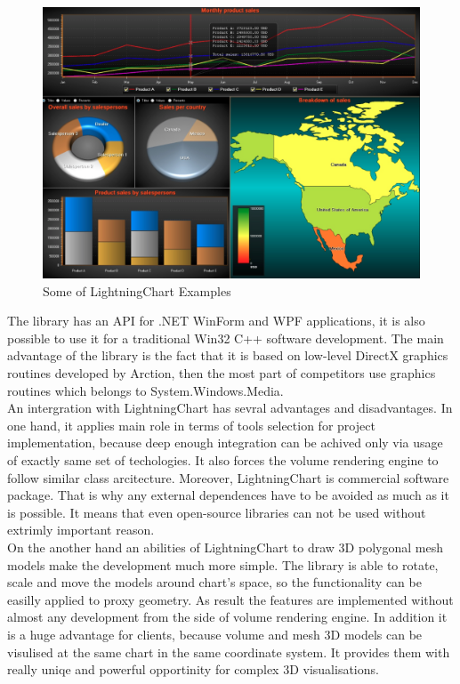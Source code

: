 \documentclass[twoside, english, 11pt]{report}
\begin{document}
\begin{figure}[!h]
\centerline{\includegraphics[scale=0.4]{img/chart}}
\caption{Some of LightningChart Examples}
\end{figure}

The library has an API for .NET WinForm and WPF applications, it is also possible to use it for a traditional Win32 C++ software development. The main advantage of the library is the fact that it is based on low-level DirectX graphics routines developed by Arction, then the most part of competitors use graphics routines which belongs to System.Windows.Media.\\

An intergration with LightningChart has sevral advantages and disadvantages. In one hand, it applies main role in terms of tools selection for project implementation, because deep enough integration can be achived only via usage of exactly same set of techologies. It also  forces the volume rendering engine to follow similar class arcitecture. Moreover, LightningChart is commercial software package. That is why any external dependences have to be avoided as much as it is possible. It means that even open-source libraries can not be used without extrimly important reason.\\

On the another hand an abilities of LightningChart to draw 3D polygonal mesh models make the development much more simple. The library is able to rotate, scale and move the models around chart's space, so the functionality can be easilly applied to proxy geometry. As result the features are implemented without almost any development from the side of volume rendering engine. In addition it is a huge advantage for clients, because volume and mesh 3D models can be visulised at the same chart in the same coordinate system. It provides them with really uniqe and powerful opportinity for complex 3D visualisations.
\end{document}
